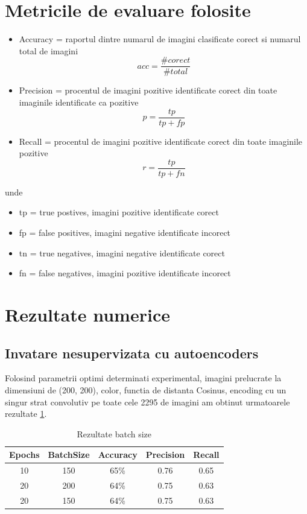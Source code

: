 \documentclass{article}
\begin{document}
\section{Metricile de evaluare folosite}
\begin{itemize}
  \item Accuracy = raportul dintre numarul de imagini clasificate corect si numarul total de imagini
	\begin{equation*}
	acc = \frac{\#corect}{\#total}
	\end{equation*}
  \item Precision = procentul de imagini pozitive identificate corect din toate imaginile identificate ca pozitive
	\begin{equation*}
	p = \frac{tp}{tp + fp}
	\end{equation*}
  \item Recall = procentul de imagini pozitive identificate corect din toate imaginile pozitive
	\begin{equation*}
	r = \frac{tp}{tp + fn}
	\end{equation*}
\end{itemize}
unde 
\begin{itemize}
  \item tp = true postives, imagini pozitive identificate corect
  \item fp = false positives, imagini negative identificate incorect
  \item tn = true negatives, imagini negative identificate corect
  \item fn = false negatives, imagini pozitive identificate incorect
\end{itemize}

\section{Rezultate numerice}

\subsection{Invatare nesupervizata cu autoencoders}

Folosind parametrii optimi determinati experimental, imagini prelucrate la dimensiuni de (200, 200), color, functia de distanta Cosinus, encoding cu un singur strat convolutiv pe toate cele 2295 de imagini am obtinut urmatoarele rezultate \ref{tab:resNum}.
\begin{table}[h!]
  \begin{center}
    \caption{Rezultate batch size}
    \label{tab:resNum}
    \begin{tabular}{c|c|c|c|c}
      \textbf{Epochs} & \textbf{BatchSize} & \textbf{Accuracy} & \textbf{Precision} & \textbf{Recall} \\
      \hline
      10 & 150 & 65\% & 0.76 & 0.65 \\
      20 & 200 & 64\% & 0.75 & 0.63 \\
      20 & 150 & 64\% & 0.75 & 0.63 \\
      \end{tabular}
  \end{center}
\end{table}
\end{document}

